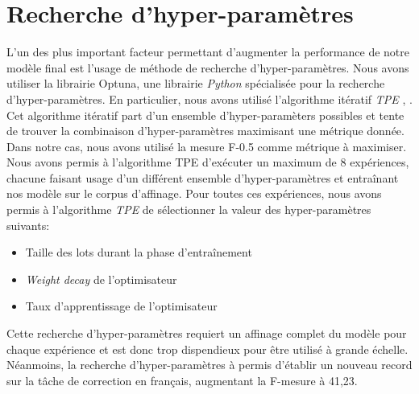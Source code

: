 \documentclass[12pt,twoside,maitrise]{dms}
\theoremstyle{definition}
\numberwithin{equation}{section}
\numberwithin{table}{chapter}
\numberwithin{figure}{chapter}
\begin{document}
\section{Recherche d'hyper-paramètres}
L'un des plus important facteur permettant d'augmenter la performance de notre
modèle final est l'usage de méthode de recherche d'hyper-paramètres. Nous avons
utiliser la librairie Optuna, une librairie \textit{Python} spécialisée pour la
recherche d'hyper-paramètres. En particulier, nous avons utilisé l'algorithme
itératif \textit{TPE}
\cite{watanabe2023treestructuredparzenestimatorunderstanding},
\cite{NIPS2011_86e8f7ab}. Cet algorithme itératif part d'un ensemble
d'hyper-paramèters possibles et tente de trouver la combinaison
d'hyper-paramètres maximisant une métrique donnée. Dans notre cas, nous avons
utilisé la mesure F-0.5 comme métrique à maximiser. Nous avons permis à
l'algorithme TPE d'exécuter un maximum de 8 expériences, chacune faisant usage
d'un différent ensemble d'hyper-paramètres et entraînant nos modèle sur le
corpus d'affinage. Pour toutes ces expériences, nous avons permis à
l'algorithme \textit{TPE} de sélectionner la valeur des hyper-paramètres
suivants:
\begin{itemize}
	\item Taille des lots durant la phase d'entraînement
	\item \textit{Weight decay} de l'optimisateur
	\item Taux d'apprentissage de l'optimisateur
\end{itemize}
Cette recherche d'hyper-paramètres requiert un affinage complet du modèle pour
chaque expérience et est donc trop dispendieux pour être utilisé à grande
échelle. Néanmoins, la recherche d'hyper-paramètres à permis d'établir un
nouveau record sur la tâche de correction en français, augmentant la F-mesure à
41,23.
\end{document}
